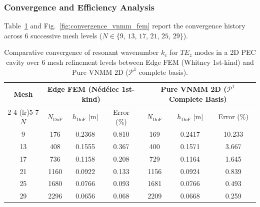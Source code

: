 \documentclass[preprint,12pt]{elsarticle}
\begin{document}
\subsubsection{Convergence and Efficiency Analysis}
Table~\ref{tab:convergence_6_meshes} and Fig.~\ref{fig:convergence_vnmm_fem} report the convergence history across 6 successive mesh levels ($N \in \{9$, $13$, $17$, $21$, $25$, $29\}$).

\begin{table}[!htbp]
\centering
\small
\caption{Comparative convergence of resonant wavenumber $k_c$ for $TE_z$ modes in a 2D PEC cavity over 6 mesh refinement levels between Edge FEM (Whitney 1st-kind) and Pure VNMM 2D ($\mathcal{P}^1$ complete basis).}
\label{tab:convergence_6_meshes}
\begin{tabular}{@{} c *{3}{c} *{3}{c} @{}}
\toprule
\textbf{Mesh} & \multicolumn{3}{c}{\textbf{Edge FEM (N\'ed\'elec 1st-kind)}} & \multicolumn{3}{c}{\textbf{Pure VNMM 2D ($\mathcal{P}^1$ Complete Basis)}} \\
\cmidrule(lr){2-4} \cmidrule(lr){5-7}
$N$ & $N_{\mathrm{DoF}}$ & $h_{\mathrm{DoF}}$ [m] & Error (\%) & $N_{\mathrm{DoF}}$ & $h_{\mathrm{DoF}}$ [m] & Error (\%) \\
\midrule
9  & 176  & 0.2368 & 0.810 & 169  & 0.2417 & 10.233 \\
13 & 408  & 0.1555 & 0.367 & 400  & 0.1571 & 3.667 \\
17 & 736  & 0.1158 & 0.208 & 729  & 0.1164 & 1.645 \\
21 & 1160 & 0.0922 & 0.133 & 1156 & 0.0924 & 0.839 \\
25 & 1680 & 0.0766 & 0.093 & 1681 & 0.0766 & 0.493 \\
29 & 2296 & 0.0656 & 0.068 & 2209 & 0.0668 & 0.259 \\
\bottomrule
\end{tabular}
\end{table}
\end{document}
